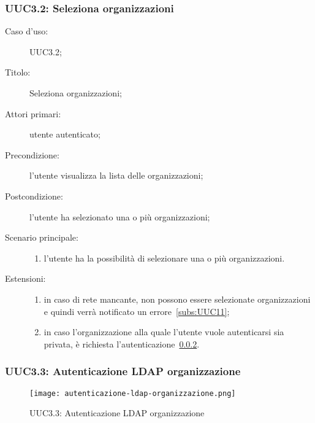\documentclass[../../../analisi-dei-requisiti.tex]{subfiles}
\begin{document}
\subsubsection{UUC3.2: Seleziona organizzazioni}%
\label{subs:UUC3.2}
\begin{description}
  \item[Caso d’uso:] UUC3.2;
  \item[Titolo:] Seleziona organizzazioni;
  \item[Attori primari:] utente autenticato;
  \item[Precondizione:] l'utente visualizza la lista delle organizzazioni;
  \item[Postcondizione:] l'utente ha selezionato una o più organizzazioni;
  \item[Scenario principale:]
        \begin{enumerate}
          \item l'utente ha la possibilità di selezionare una o più organizzazioni.
        \end{enumerate}
  \item[Estensioni:]
        \begin{enumerate}
          \item in caso di rete mancante, non possono essere selezionate organizzazioni e quindi verrà notificato un errore~\ref{subs:UUC11};
          \item in caso l'organizzazione alla quale l'utente vuole autenticarsi sia privata, è richiesta l'autenticazione~\ref{subs:UUC3.3}.
        \end{enumerate}
\end{description}

\subsubsection{UUC3.3: Autenticazione LDAP organizzazione}%
\label{subs:UUC3.3}

\begin{figure}[H]
  \centering
  \texttt{[image: autenticazione-ldap-organizzazione.png]}
  \caption{UUC3.3: Autenticazione LDAP organizzazione}%
  \label{fig:UUC3.3}
\end{figure}
\end{document}
